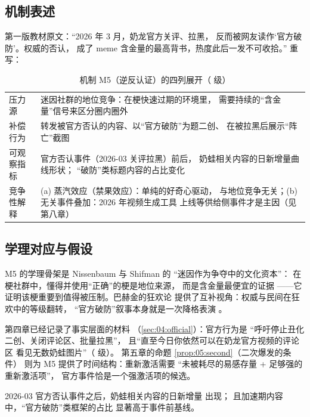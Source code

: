 \subsection{机制表述}

第一版教材原文：“2026 年 3 月，奶龙官方关评、拉黑，
反而被网友读作‘官方破防’。权威的否认，
成了 meme 含金量的最高背书，热度此后一发不可收拾。”
重写：

\begin{table}[htbp]\centering
  \caption{机制 M5（逆反认证）的四列展开（ 级）}
  \label{tab:07:m5}
  \small
  \begin{tabularx}{\textwidth}{@{}lX@{}}
    \toprule
    压力源 & 迷因社群的地位竞争：在梗快速过期的环境里，
      需要持续的“含金量”信号来区分圈内圈外 \\
    补偿行为 & 转发被官方否认的内容、以“官方破防”为题二创、
      在被拉黑后展示“阵亡”截图 \\
    可观察指标 & 官方否认事件（2026-03 关评拉黑）前后，
      奶蛙相关内容的日新增量曲线形状；
      “破防”类标题内容的占比变化 \\
    竞争性解释 & (a) 蒸汽效应（禁果效应）：单纯的好奇心驱动，
      与地位竞争无关；(b) 无关事件叠加：2026 年视频生成工具
      上线等供给侧事件才是主因（见第八章） \\
    \bottomrule
  \end{tabularx}
\end{table}

\subsection{学理对应与假设}

M5 的学理骨架是 Nissenbaum 与 Shifman 的
“迷因作为争夺中的文化资本”\cite{nissenbaum2015contested}：
在梗社群中，懂得并使用“正确”的梗是地位来源，
而是含金量最便宜的证据
——它证明该梗重要到值得被压制。巴赫金的狂欢论
提供了互补视角：权威与民间在狂欢中的等级翻转，
“官方破防”叙事本身就是一次降格表演
\cite{bakhtin1968rabelais}。

第四章已经记录了事实层面的材料
（\ref{sec:04:official}）：官方行为是
“呼吁停止丑化二创、关闭评论区、批量拉黑”，
且“直至今日你依然可以在奶龙官方视频的评论区
看见无数奶蛙图片”（ 级）。
第五章的命题 \ref{prop:05:second}（二次爆发的条件）
则为 M5 提供了时间结构：重新激活需要
“未被耗尽的易感存量 + 足够强的重新激活项”，
官方事件恰是一个强激活项的候选。

\begin{hypothesis}[H7.5 逆反认证假设]\label{hyp:07:m5}
  2026-03 官方否认事件之后，奶蛙相关内容的日新增量
  出现；
  且加速期内容中，“官方破防”类框架的占比
  显著高于事件前基线。
\end{hypothesis}

